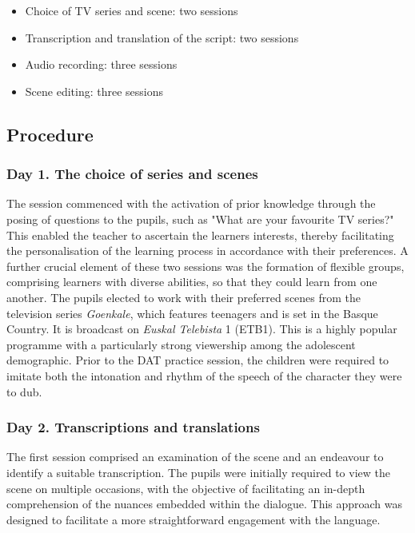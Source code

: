 \begin{itemize}
    \item Choice of TV series and scene: two sessions
    
    \item Transcription and translation of the script: two sessions
    
    \item Audio recording: three sessions
    
    \item Scene editing: three sessions
\end{itemize}

\subsection{Procedure}\label{sub-sec-procedure}

\subsubsection{Day 1. The choice of series and scenes}

The session commenced with the activation of prior knowledge through the
posing of questions to the pupils, such as "What are your favourite TV
series?" This enabled the teacher to ascertain the
learners\textquotesingle{} interests, thereby facilitating the
personalisation of the learning process in accordance with their
preferences. A further crucial element of these two sessions was the
formation of flexible groups, comprising learners with diverse
abilities, so that they could learn from one another. The pupils elected
to work with their preferred scenes from the television series
\emph{Goenkale}, which features teenagers and is set in the Basque
Country. It is broadcast on \emph{Euskal Telebista} 1 (ETB1). This is a
highly popular programme with a particularly strong viewership among the
adolescent demographic. Prior to the DAT practice session, the children
were required to imitate both the intonation and rhythm of the speech of
the character they were to dub.

\subsubsection{Day 2. Transcriptions and translations}

The first session comprised an examination of the scene and an endeavour
to identify a suitable transcription. The pupils were initially required
to view the scene on multiple occasions, with the objective of
facilitating an in-depth comprehension of the nuances embedded within
the dialogue. This approach was designed to facilitate a more
straightforward engagement with the language.

